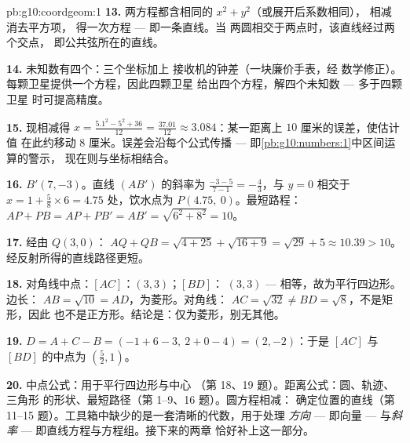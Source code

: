 \begin{solution}{pb:g10:coordgeom:1}
\textbf{13.} 两方程都含相同的 $x^2 + y^2$（或展开后系数相同），
相减消去平方项，
得一次方程 --- 即一条直线。当
两圆相交于两点时，该直线经过两个交点，
即公共弦所在的直线。

\textbf{14.} 未知数有四个：三个坐标加上
接收机的钟差（一块廉价手表，经
数学修正）。每颗卫星提供一个方程，因此四颗卫星
给出四个方程，解四个未知数 --- 多于四颗卫星
时可提高精度。

\textbf{15.} 现相减得
$x = \frac{5.1^2 - 5^2 + 36}{12} = \frac{37.01}{12} \approx
3.084$：某一距离上 $10$ 厘米的误差，使估计值
在此约移动 $8$ 厘米。误差会沿每个公式传播 ---
即\cref{pb:g10:numbers:1}中区间运算的警示，
现在则与坐标相结合。

\textbf{16.} $B' (7, -3)$。直线 $(AB')$ 的斜率为
$\frac{-3 - 5}{7 - 1} = -\frac43$，与 $y = 0$ 相交于
$x = 1 + \frac{5}{8} \times 6 = 4.75$ 处，饮水点为
$P(4.75,\ 0)$。最短路程：$AP + PB = AP + PB' = AB' =
\sqrt{6^2 + 8^2} = 10$。

\textbf{17.} 经由 $Q(3, 0)$：
$AQ + QB = \sqrt{4 + 25} + \sqrt{16 + 9} = \sqrt{29} + 5
\approx 10.39 > 10$。经反射所得的直线路径更短。

\textbf{18.} 对角线中点：$[AC]$：$(3, 3)$；$[BD]$：
$(3, 3)$ --- 相等，故为平行四边形。边长：
$AB = \sqrt{10} = AD$，为菱形。对角线：
$AC = \sqrt{32} \neq BD = \sqrt{8}$，不是矩形，因此
也不是正方形。结论是：仅为菱形，别无其他。

\textbf{19.} $D = A + C - B = (-1 + 6 - 3,\ 2 + 0 - 4) =
(2, -2)$：于是 $[AC]$ 与 $[BD]$ 的中点为
$\left(\frac52, 1\right)$。

\textbf{20.} 中点公式：用于平行四边形与中心
（第 18、19 题）。距离公式：圆、轨迹、三角形
的形状、最短路径（第 1--9、16 题）。圆方程相减：
确定位置的直线（第
11--15 题）。工具箱中缺少的是一套清晰的代数，用于处理
\emph{方向} --- 即向量 --- 与\emph{斜率} ---
即直线方程与方程组。接下来的两章
恰好补上这一部分。
\end{solution}
